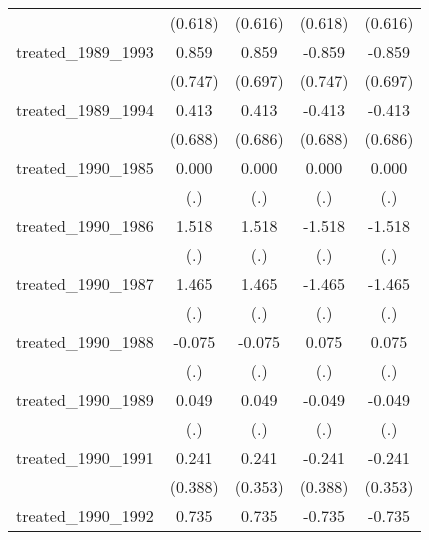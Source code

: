 {\begin{tabular}{l*{4}{c}}
            &     (0.618)         &     (0.616)         &     (0.618)         &     (0.616)         \\
[1em]
treated\_1989\_1993&       0.859         &       0.859         &      -0.859         &      -0.859         \\
            &     (0.747)         &     (0.697)         &     (0.747)         &     (0.697)         \\
[1em]
treated\_1989\_1994&       0.413         &       0.413         &      -0.413         &      -0.413         \\
            &     (0.688)         &     (0.686)         &     (0.688)         &     (0.686)         \\
[1em]
treated\_1990\_1985&       0.000         &       0.000         &       0.000         &       0.000         \\
            &         (.)         &         (.)         &         (.)         &         (.)         \\
[1em]
treated\_1990\_1986&       1.518         &       1.518         &      -1.518         &      -1.518         \\
            &         (.)         &         (.)         &         (.)         &         (.)         \\
[1em]
treated\_1990\_1987&       1.465         &       1.465         &      -1.465         &      -1.465         \\
            &         (.)         &         (.)         &         (.)         &         (.)         \\
[1em]
treated\_1990\_1988&      -0.075         &      -0.075         &       0.075         &       0.075         \\
            &         (.)         &         (.)         &         (.)         &         (.)         \\
[1em]
treated\_1990\_1989&       0.049         &       0.049         &      -0.049         &      -0.049         \\
            &         (.)         &         (.)         &         (.)         &         (.)         \\
[1em]
treated\_1990\_1991&       0.241         &       0.241         &      -0.241         &      -0.241         \\
            &     (0.388)         &     (0.353)         &     (0.388)         &     (0.353)         \\
[1em]
treated\_1990\_1992&       0.735         &       0.735         &      -0.735         &      -0.735         \\

\end{tabular}}
